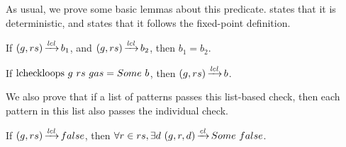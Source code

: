 As usual, we prove some basic lemmas
about this predicate.
states that it is
deterministic,
and 
states that it follows
the fixed-point definition.

\begin{lemma}
    \label{lemma:lcheckloops-determinism}
    If $(g,rs) \operatorname{\xrightarrow{\mathit{lcl}}} b_1$,
    and $(g,rs) \operatorname{\xrightarrow{\mathit{lcl}}} b_2$,
    then $b_1=b_2$.
\end{lemma}

\begin{lemma}
    \label{lemma:lcheckloops-follows}
    If $\text{lcheckloops}{}\ g\ rs\ gas = Some\ b$,
    then $(g,rs) \operatorname{\xrightarrow{\mathit{lcl}}} b$.
\end{lemma}

We also prove that if a list of patterns
passes this list-based check,
then each pattern in this list also
passes the individual check.

\begin{lemma}%
    \label{lemma:lcheckloops-safety}
    If $(g,rs) \operatorname{\xrightarrow{\mathit{lcl}}} false$,
    then $\forall r \in rs, \exists d\ \CheckLoops{g}{r}{d}{\Some false}$.
\end{lemma}
